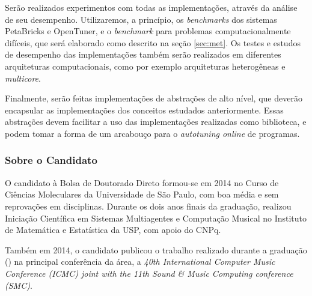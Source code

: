 \documentclass[a4paper, 11pt]{article}
\begin{document}
Serão realizados experimentos com todas as implementações, através da análise 
de seu desempenho. Utilizaremos, a princípio, os \emph{benchmarks} dos sistemas
PetaBricks e OpenTuner, e o \emph{benchmark} para problemas computacionalmente
difíceis, que será elaborado como descrito na seção \ref{sec:met}. 
Os testes e estudos de desempenho das implementações também serão realizados 
em diferentes arquiteturas computacionais, como por exemplo arquiteturas 
heterogêneas e \emph{multicore}. 

Finalmente, serão feitas implementações de abstrações de alto
nível, que deverão encapsular as implementações dos conceitos estudados 
anteriormente. Essas abstrações devem facilitar a uso das implementações 
realizadas como biblioteca, e podem tomar a forma de um arcabouço para o 
\emph{autotuning online} de programas.

\subsubsection{Sobre o Candidato}

O candidato à Bolsa de Doutorado Direto formou-se em 2014 no Curso de Ciências
Moleculares da Universidade de São Paulo, com boa média e sem reprovações em
disciplinas. Durante os dois anos finais da graduação, realizou Iniciação 
Científica em Sistemas Multiagentes e Computação Musical no Instituto de 
Matemática e Estatística da USP, com apoio do CNPq. 

Também em 2014, o candidato publicou o trabalho realizado durante a graduação 
(\citet{bruel2014protocol}) na principal conferência da área, a 
\emph{40th International Computer Music Conference (ICMC) joint with the 
11th Sound \& Music Computing conference (SMC)}.
\end{document}
